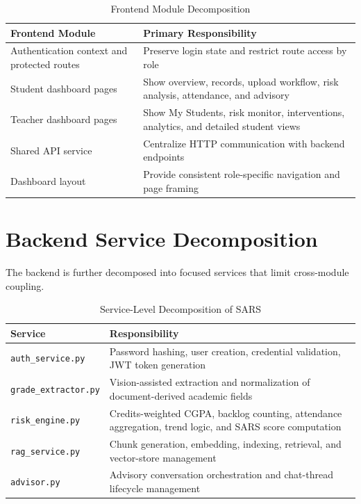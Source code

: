 \begin{table}[H]
\centering
\caption{Frontend Module Decomposition}
\begin{tabularx}{\textwidth}{>{\raggedright\arraybackslash}p{} >{\raggedright\arraybackslash}X}
\toprule
\textbf{Frontend Module} & \textbf{Primary Responsibility} \\
\midrule
Authentication context and protected routes & Preserve login state and restrict route access by role \\
Student dashboard pages & Show overview, records, upload workflow, risk analysis, attendance, and advisory \\
Teacher dashboard pages & Show My Students, risk monitor, interventions, analytics, and detailed student views \\
Shared API service & Centralize HTTP communication with backend endpoints \\
Dashboard layout & Provide consistent role-specific navigation and page framing \\
\bottomrule
\end{tabularx}
\end{table}

\section{Backend Service Decomposition}
The backend is further decomposed into focused services that limit cross-module coupling.

\begin{table}[H]
\centering
\caption{Service-Level Decomposition of SARS}
\begin{tabularx}{\textwidth}{>{\raggedright\arraybackslash}p{} >{\raggedright\arraybackslash}X}
\toprule
\textbf{Service} & \textbf{Responsibility} \\
\midrule
\texttt{auth\_service.py} & Password hashing, user creation, credential validation, JWT token generation \\
\texttt{grade\_extractor.py} & Vision-assisted extraction and normalization of document-derived academic fields \\
\texttt{risk\_engine.py} & Credits-weighted CGPA, backlog counting, attendance aggregation, trend logic, and SARS score computation \\
\texttt{rag\_service.py} & Chunk generation, embedding, indexing, retrieval, and vector-store management \\
\texttt{advisor.py} & Advisory conversation orchestration and chat-thread lifecycle management \\
\bottomrule
\end{tabularx}
\end{table}

